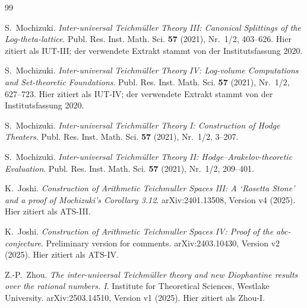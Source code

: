 \documentclass[11pt,a4paper]{article}
\theoremstyle{definition}
\begin{document}
\begin{thebibliography}{99}
\small

S.~Mochizuki.
\newblock \emph{Inter-universal Teichmüller Theory III: Canonical Splittings of
the Log-theta-lattice}.
\newblock Publ. Res. Inst. Math. Sci. \textbf{57} (2021), Nr.~1/2, 403--626.
\newblock Hier zitiert als IUT-III; der verwendete Extrakt stammt von der
Institutsfassung 2020.

S.~Mochizuki.
\newblock \emph{Inter-universal Teichmüller Theory IV: Log-volume Computations
and Set-theoretic Foundations}.
\newblock Publ. Res. Inst. Math. Sci. \textbf{57} (2021), Nr.~1/2, 627--723.
\newblock Hier zitiert als IUT-IV; der verwendete Extrakt stammt von der
Institutsfassung 2020.

S.~Mochizuki.
\newblock \emph{Inter-universal Teichmüller Theory I: Construction of Hodge
Theaters}.
\newblock Publ. Res. Inst. Math. Sci. \textbf{57} (2021), Nr.~1/2, 3--207.

S.~Mochizuki.
\newblock \emph{Inter-universal Teichmüller Theory II:
Hodge--Arakelov-theoretic Evaluation}.
\newblock Publ. Res. Inst. Math. Sci. \textbf{57} (2021), Nr.~1/2, 209--401.

K.~Joshi.
\newblock \emph{Construction of Arithmetic Teichmuller Spaces III: A `Rosetta
Stone' and a proof of Mochizuki's Corollary 3.12}.
\newblock arXiv:2401.13508, Version v4 (2025). Hier zitiert als ATS-III.

K.~Joshi.
\newblock \emph{Construction of Arithmetic Teichmuller Spaces IV: Proof of the
abc-conjecture}. Preliminary version for comments.
\newblock arXiv:2403.10430, Version v2 (2025). Hier zitiert als ATS-IV.

Z.-P.~Zhou.
\newblock \emph{The inter-universal Teichmüller theory and new Diophantine
results over the rational numbers. I}.
\newblock Institute for Theoretical Sciences, Westlake University.
\newblock arXiv:2503.14510, Version v1 (2025). Hier zitiert als Zhou-I.


\end{thebibliography}
\end{document}
